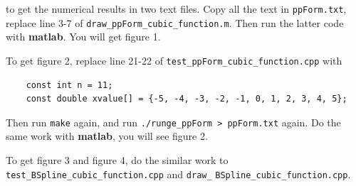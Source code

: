 \documentclass[11pt,en]{elegantpaper}
\begin{document}
to get the numerical results in two text files. Copy all the text in \verb|ppForm.txt|, replace line 3-7 of \verb|draw_ppForm_cubic_function.m|. Then run the latter code with \textbf{matlab}. You will get figure 1.

To get figure 2, replace line 21-22 of \verb|test_ppForm_cubic_function.cpp| with

\begin{lstlisting}
    const int n = 11;
    const double xvalue[] = {-5, -4, -3, -2, -1, 0, 1, 2, 3, 4, 5};
\end{lstlisting}

Then run \verb|make| again, and run \verb|./runge_ppForm > ppForm.txt| again. Do the same work with \textbf{matlab}, you will see figure 2.

To get figure 3 and figure 4, do the similar work to \verb|test_BSpline_cubic_function.cpp| and \verb|draw_| \verb|BSpline_cubic_function.cpp|.
\end{document}
